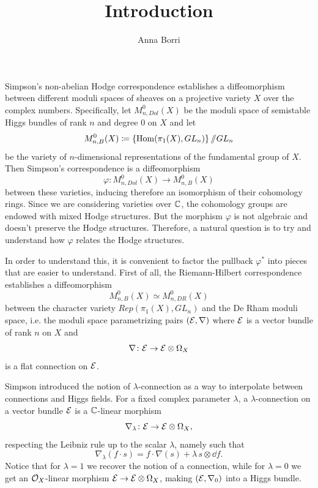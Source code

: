 \documentclass{article}
\title{Introduction}
\author{Anna Borri}
\begin{document}
Simpson's non-abelian Hodge correspondence establishes a diffeomorphism between different moduli spaces of sheaves on a projective variety $X$ over the complex numbers.
Specifically, let $M_{n,Dol}^0(X)$ be the moduli space of semistable Higgs bundles of rank $n$ and degree $0$ on $X$ and let
\begin{equation}
M_{n,B}^0(X) \coloneqq \left\{ \operatorname{Hom}(\pi_1(X), GL_n) \right\} /\!\!/ GL_n
\end{equation} 
be the variety of $n$-dimensional representations of the fundamental group of $X$. Then Simpson's correspondence is a diffeomorphism
\begin{equation}
\varphi\colon M_{n,Dol}^0(X) \to M_{n,B}^0(X) \label{simpson correspondence}
\end{equation}
between these varieties, inducing therefore an isomorphism of their cohomology rings.
Since we are considering varieties over $\mathbb{C}$, the cohomology groups are endowed with mixed Hodge structures. But the morphism $\varphi$ is not algebraic and doesn't preserve the Hodge structures. Therefore, a natural question is to try and understand how $\varphi$ relates the Hodge structures.

In order to understand this, it is convenient to factor the pullback $\varphi^*$ into pieces that are easier to understand.
First of all, the Riemann-Hilbert correspondence establishes a diffeomorphism
\begin{equation}
M_{n,B}^0(X) \simeq M_{n, DR}^0(X)
\end{equation}
between the character variety $Rep(\pi_1(X), GL_n)$ and the De Rham moduli space, i.e. the moduli space parametrizing pairs $(\mathcal{E}, \nabla)$ where $\mathcal{E}$ is a vector bundle of rank $n$ on $X$ and
\begin{equation}
\nabla\colon \mathcal{E} \to \mathcal{E}\otimes\Omega_X
\end{equation}
is a flat connection on $\mathcal{E}$.

Simpson introduced the notion of $\lambda$-connection as a way to interpolate between connections and Higgs fields. For a fixed complex parameter $\lambda$, a $\lambda$-connection on a vector bundle $\mathcal{E}$ is a $\mathbb{C}$-linear morphism
\begin{equation}
\nabla_{\lambda}\colon \mathcal{E} \to \mathcal{E} \otimes \Omega_X,
\end{equation}
respecting the Leibniz rule up to the scalar $\lambda$, namely such that
\begin{equation}
\nabla_{\lambda}(f \cdot s) = f \cdot \nabla(s) + \lambda \, s \otimes \dd f.
\end{equation}
Notice that for $\lambda = 1$ we recover the notion of a connection, while for $\lambda = 0$ we get an $\mathcal{O}_X$-linear morphism $\mathcal{E} \to \mathcal{E}\otimes \Omega_X$, making $(\mathcal{E}, \nabla_0)$ into a Higgs bundle.
\end{document}
